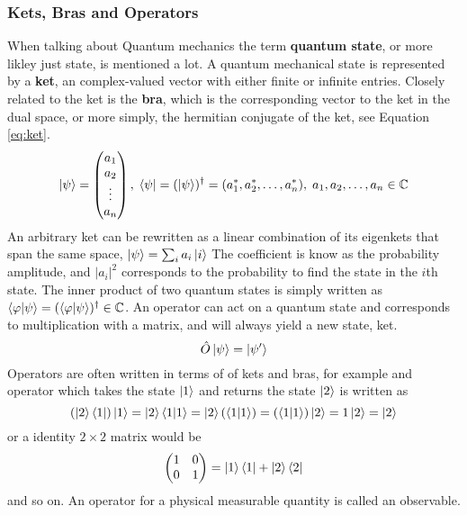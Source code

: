 \subsubsection{Kets, Bras and Operators}
When talking about Quantum mechanics the term \textbf{quantum state}, or more likley just state, is mentioned a lot. A quantum mechanical state is represented by a \textbf{ket}, an complex-valued vector with either finite or infinite entries. Closely related to the ket is the \textbf{bra}, which is the corresponding vector to the ket in the dual space, or more simply, the hermitian conjugate of the ket, see Equation \ref{eq:ket}.
\begin{equation}
\label{eq:ket}
\ket{\psi} = \begin{pmatrix}
a_1 \\ a_2 \\ \vdots \\ a_n
\end{pmatrix},\;
\bra{\psi} = (\ket{\psi})^{\dagger} = (a_1^{*}, a_2^{*}, \dots, a_n^{*}),\; a_1,a_2,\dots,a_n \in \mathbb{C}
\end{equation} 
An arbitrary ket can be rewritten as a linear combination of its eigenkets that span the same space, $\ket{\psi} = \sum_i a_i\ket{i}$ The coefficient is know as the probability amplitude, and $|a_i|^2$ corresponds to the probability to find the state in the $i$th state. 
The inner product of two quantum states is simply written as 
$\bra{\varphi}\ket{\psi} = (\bra{\varphi}\ket{\psi})^\dagger \in \mathbb{C}$. 
An operator can act on a quantum state and corresponds to multiplication with a matrix, and will always yield a new state, ket. 
\begin{equation}
\hat{O}\ket{\psi} = \ket{\psi'}
\end{equation}
Operators are often written in terms of of kets and bras, for example and operator which takes the state $\ket{1}$ and returns the state $\ket{2}$ is written as
\begin{equation}
(\ket{2}\bra{1})\ket{1} = \ket{2}\bra{1}\ket{1} = \ket{2}(\bra{1}\ket{1}) = (\bra{1}\ket{1})\ket{2} = 1 \ket{2} = \ket{2}
\end{equation}
or a identity $2\times 2$ matrix would be
\begin{equation}
 \begin{pmatrix}
 1 & 0 \\ 0 & 1
 \end{pmatrix} = \ket{1}\bra{1} + \ket{2}\bra{2} 
\end{equation}
and so on. An operator for a physical measurable quantity is called an observable.

